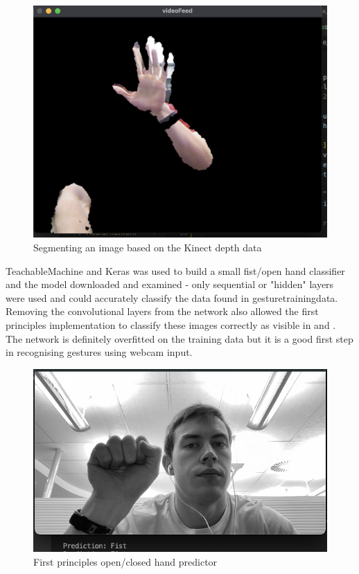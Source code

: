 \begin{figure}[h]
    \centering
    \includegraphics[width=0.7\linewidth]{figures/kinect_segment2.png}
    \caption{Segmenting an image based on the Kinect depth data}
    \label{fig:kinect_segment2}
\end{figure}

TeachableMachine and Keras was used to build a small fist/open hand classifier and the model downloaded and examined - only sequential or "hidden" layers were used and could accurately classify the data found in gesturetrainingdata. Removing the convolutional layers from the network also allowed the first principles implementation to classify these images correctly as visible in  and . The network is definitely overfitted on the training data but it is a good first step in recognising gestures using webcam input.

\begin{figure}[h]
    \centering
    \includegraphics[width=0.7\linewidth]{figures/layers_gesture_predictor1.png}
    \caption{First principles open/closed hand predictor}
    \label{fig:layers_gesture_predictor1}
\end{figure}

